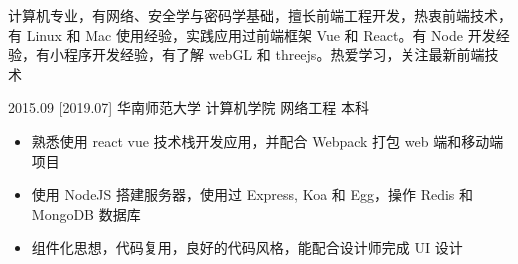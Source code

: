 \documentclass[zh]{resume}
\begin{document}
\makeheader

{\onehalfspacing\hspace{2em}%
计算机专业，有网络、安全学与密码学基础，擅长前端工程开发，热衷前端技术，有 Linux 和 Mac 使用经验，实践应用过前端框架 Vue 和 React。有 Node 开发经验，有小程序开发经验，有了解 webGL 和 threejs。热爱学习，关注最新前端技术
\par}


\begin{educations}
  \education%
    {2015.09}%
    [2019.07]%
    {华南师范大学}%
    {计算机学院}%
    {网络工程}%
    {本科}
\end{educations}

\begin{itemize}
  \item 熟悉使用 react vue 技术栈开发应用，并配合 Webpack 打包 web 端和移动端项目
  \item 使用 NodeJS 搭建服务器，使用过 Express, Koa 和 Egg，操作 Redis 和 MongoDB 数据库
  \item 组件化思想，代码复用，良好的代码风格，能配合设计师完成 UI 设计
\end{itemize}
\end{document}
